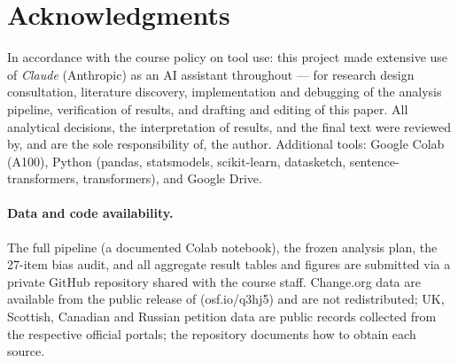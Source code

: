 \documentclass[10pt,twocolumn]{article}
\begin{document}
\section*{Acknowledgments}
In accordance with the course policy on tool use: this project made extensive use of \emph{Claude} (Anthropic) as an AI assistant throughout --- for research design consultation, literature discovery, implementation and debugging of the analysis pipeline, verification of results, and drafting and editing of this paper. All analytical decisions, the interpretation of results, and the final text were reviewed by, and are the sole responsibility of, the author. Additional tools: Google Colab (A100), Python (pandas, statsmodels, scikit-learn, datasketch, sentence-transformers, transformers), and Google Drive.

\paragraph{Data and code availability.} The full pipeline (a documented Colab notebook), the frozen analysis plan, the 27-item bias audit, and all aggregate result tables and figures are submitted via a private GitHub repository shared with the course staff. Change.org data are available from the public release of \cite{corpus2026introducing} (osf.io/q3hj5) and are not redistributed; UK, Scottish, Canadian and Russian petition data are public records collected from the respective official portals; the repository documents how to obtain each source.
\end{document}
